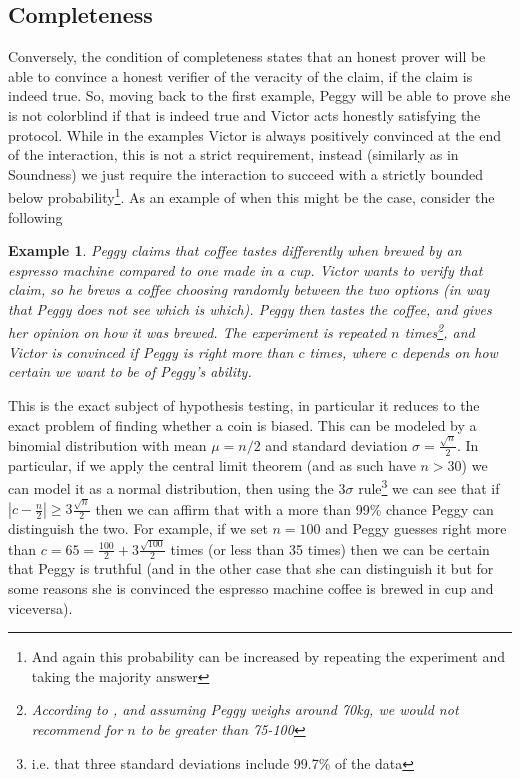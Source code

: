 \documentclass{article}
\newtheorem{example}{Example}
\begin{document}
\subsection{Completeness}
Conversely, the condition of completeness states that an honest prover will be able to convince a honest verifier of the veracity of the claim, if the claim is indeed true. So, moving back to the first example, Peggy will be able to prove she is not colorblind if that is indeed true and Victor acts honestly satisfying the protocol. While in the examples Victor is always positively convinced at the end of the interaction, this is not a strict requirement, instead (similarly as in Soundness) we just require the interaction to succeed with a strictly bounded below probability\footnote{And again this probability can be increased by repeating the experiment and taking the majority answer}. As an example of when this might be the case, consider the following \begin{example}
Peggy claims that coffee tastes differently when brewed by an espresso machine compared to one made in a cup. Victor wants to verify that claim, so he brews a coffee choosing randomly between the two options (in way that Peggy does not see which is which). Peggy then tastes the coffee, and gives her opinion on how it was brewed. The experiment is repeated $n$ times\footnote{According to \cite{chambersChemIDplus0000302272XFSBVAOIAHNAPCNPVHKAFCSAN}, and assuming Peggy weighs around 70kg, we would not recommend for $n$ to be greater than 75-100}, and Victor is convinced if Peggy is right more than $c$ times, where $c$ depends on how certain we want to be of Peggy's ability. 
\end{example}

This is the exact subject of hypothesis testing, in particular it reduces to the exact problem of finding whether a coin is biased. This can be modeled by a binomial distribution with mean $\mu = n/2$ and standard deviation $\sigma = \frac{\sqrt{n}}{2}$. In particular, if we apply the central limit theorem (and as such have $n > 30$) we can model it as a normal distribution, then using the $3\sigma$ rule\footnote{i.e. that three standard deviations include 99.7\% of the data} we can see that if $|c - \frac{n}{2}| \geq 3\frac{\sqrt{n}}{2}$ then we can affirm that with a more than 99\% chance Peggy can distinguish the two. For example, if we set $n = 100$ and Peggy guesses right more than $c = 65 = \frac{100}{2} + 3 \frac{\sqrt{100}}{2}$ times (or less than 35 times) then we can be certain that Peggy is truthful (and in the other case that she can distinguish it but for some reasons she is convinced the espresso machine coffee is brewed in cup and viceversa). 
\end{document}
